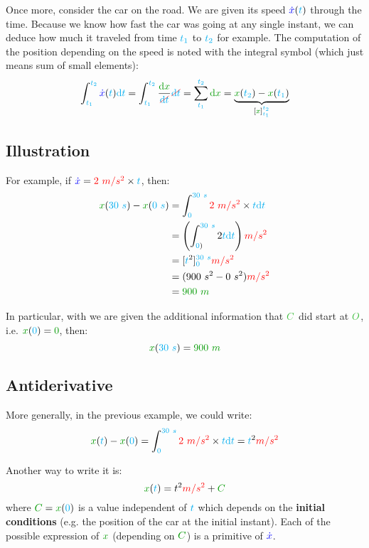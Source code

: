 Once more, consider the car on the road. We are given its speed
$\textcolor{blue}{\dot x}(\textcolor{cyan}{t})$ through the time. Because we know how fast the
car was going at any single instant, we can deduce how much it traveled
from time $\textcolor{cyan}{t_1}$ to $\textcolor{cyan}{t_2}$ for example. The computation
of the position depending on the speed is
noted with the integral symbol (which just means sum of small elements):
\[
\int_{\delay{t_1}}^{\delay{t_2}} \speed{\dot x}(\delay{t}) \delay{\dt}
= \int_{\delay{t_1}}^{\delay{t_2}} \frac {\dist{\d x}} {\strike[red]{\delay{\dt}}} \strike[red]{\delay{\dt}}
= \sum_{\delay{t_1}}^{\delay{t_2}} \dist{\d x}
= \underbrace{
	\dist{x}(\delay{t_2}) - \dist{x}(\delay{t_1})
}_{[\dist{x}]_{\delay{t_1}}^{\delay{t_2}}}
\]


\subsection{Illustration}

For example, if $\textcolor{blue}{\dot x} = \textcolor{red}{2~m/s^2} \times \textcolor{cyan}{t}$, then:
\begin{align*}
\dist{x}(\delay{30~s}) - \dist{x}(\delay{0~s})
&= \int_{\delay{0}}^{\delay{30~s}} \accel{2~m/s^2} \times \delay{t} \delay{\dt} \\
&= \left(\int_{\delay{0})}^{\delay{30~s}} 2 \delay{t} \delay{\dt}\right) \accel{m/s^2} \\
&= [\delay{t}^2]_{\delay{0}}^{\delay{30~s}} \accel{m/s^2} \\
&= (900~s^2 - 0~s^2) \accel{m/s^2} \\
&= \dist{900~m}
\end{align*}

In particular, with we are given the additional information that $\posit{C}$
did start at $\posit{O}$, i.e.  $\dist{x}(\delay{0}) = \dist{0}$, then:
\[
\dist{x}(\delay{30~s}) = \dist{900~m}
\]


\subsection{Antiderivative}

More generally, in the previous example, we could write:
\[
\dist{x}(\delay{t}) - \dist{x}(\delay{0})
= \int_{\delay{0}}^{\delay{30~s}} \accel{2~m/s^2} \times \delay{t} \delay{\dt}
= \delay{t}^2 \accel{m/s^2}
\]

Another way to write it is:
\[
\dist{x}(\delay{t})
= t^2 \accel{m/s^2} + \dist{C}
\]
where $\dist{C} = \dist{x}(\delay{0})$ is a value independent of
$\textcolor{cyan}{t}$ which depends on the \textbf{initial conditions} (e.g. the
position of the car at the initial instant). Each of the possible
expression of $\dist{x}$ (depending on $\dist{C}$) is a primitive of
$\textcolor{blue}{\dot x}$.



